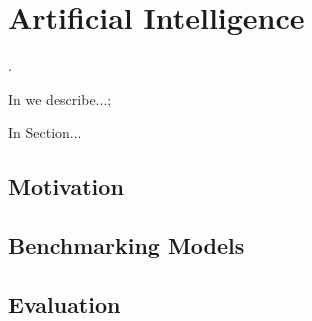 \chapter{Artificial Intelligence}\label{chap:ai}
\dummy .

\begin{chapterorganization}
  \item In  we describe...;
  \item In Section...
\end{chapterorganization}

\section{Motivation}\label{sec:aimotivation}
\dummy

\section{Benchmarking Models}\label{sec:ai_benchmark}
\dummy

\section{Evaluation}\label{sec:ai_eval}
\dummy